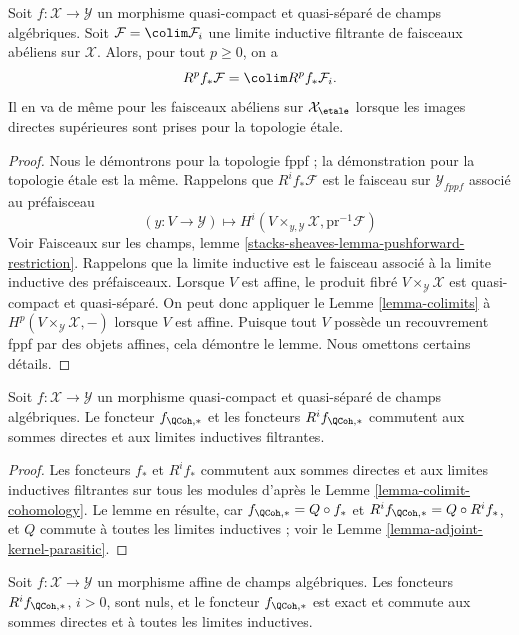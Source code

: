 \begin{lemma}
\label{lemma-colimit-cohomology}
Soit $f : \mathcal{X} \to \mathcal{Y}$ un morphisme quasi-compact et quasi-séparé
de champs algébriques. Soit $\mathcal{F} = \colim \mathcal{F}_i$
une limite inductive filtrante de faisceaux abéliens sur $\mathcal{X}$.
Alors, pour tout $p \geq 0$, on a
$$
R^pf_*\mathcal{F} = \colim R^pf_*\mathcal{F}_i.
$$
Il en va de même pour les faisceaux abéliens sur $\mathcal{X}_\etale$
lorsque les images directes supérieures sont prises pour la topologie étale.
\end{lemma}

\begin{proof}
Nous le démontrons pour la topologie fppf ; la démonstration pour la topologie
étale est la même. Rappelons que $R^if_*\mathcal{F}$ est le faisceau sur
$\mathcal{Y}_{fppf}$ associé au préfaisceau
$$
(y : V \to \mathcal{Y})
\longmapsto
H^i(V \times_{y, \mathcal{Y}} \mathcal{X}, \text{pr}^{-1}\mathcal{F})
$$
Voir
Faisceaux sur les champs, lemme \ref{stacks-sheaves-lemma-pushforward-restriction}.
Rappelons que la limite inductive est le faisceau associé à la limite inductive des préfaisceaux.
Lorsque $V$ est affine, le produit fibré $V \times_\mathcal{Y} \mathcal{X}$
est quasi-compact et quasi-séparé. On peut donc appliquer le
Lemme \ref{lemma-colimits} à $H^p(V \times_\mathcal{Y} \mathcal{X}, -)$
lorsque $V$ est affine. Puisque tout $V$ possède un recouvrement fppf par des
objets affines, cela démontre le lemme. Nous omettons certains détails.
\end{proof}

\begin{lemma}
\label{lemma-quasi-coherent-pushforward-direct-sums}
Soit $f : \mathcal{X} \to \mathcal{Y}$ un morphisme quasi-compact et quasi-séparé
de champs algébriques. Le foncteur $f_{\QCoh, *}$
et les foncteurs $R^if_{\QCoh, *}$ commutent aux sommes directes
et aux limites inductives filtrantes.
\end{lemma}

\begin{proof}
Les foncteurs $f_*$ et $R^if_*$ commutent aux sommes directes et aux limites
inductives filtrantes sur tous les modules d'après le Lemme \ref{lemma-colimit-cohomology}.
Le lemme en résulte, car $f_{\QCoh, *} = Q \circ f_*$ et
$R^if_{\QCoh, *} = Q \circ R^if_*$, et $Q$ commute à
toutes les limites inductives ; voir le Lemme \ref{lemma-adjoint-kernel-parasitic}.
\end{proof}

\begin{lemma}
\label{lemma-quasi-coherent-pushforward-affine}
Soit $f : \mathcal{X} \to \mathcal{Y}$ un morphisme affine de champs
algébriques. Les foncteurs $R^if_{\QCoh, *}$, $i > 0$, sont nuls, et le foncteur
$f_{\QCoh, *}$ est exact et commute aux sommes directes et à toutes les limites inductives.
\end{lemma}

